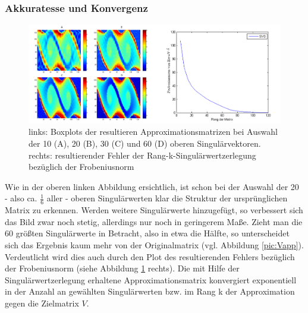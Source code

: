 \documentclass[12pt,a4paper,twoside]{article}
\begin{document}
\subsubsection*{Akkuratesse und Konvergenz}
\begin{figure}[h]
	
	\centering
	\includegraphics[scale=0.45]{SVD_plots_graph}
	\caption{\label{pic:SVD_plots}links: Boxplots der resultieren Approximationsmatrizen bei Auswahl der 10 (A), 20 (B), 30 (C) und 60 (D) oberen Singulärvektoren. rechts: resultierender Fehler der Rang-k-Singulärwertzerlegung bezüglich der Frobeniusnorm}
\end{figure}
Wie in der oberen linken Abbildung ersichtlich, ist schon bei der Auswahl der 20 - also ca. $\frac{1}{6}$ aller - oberen Singulärwerten klar die Struktur der ursprünglichen Matrix zu erkennen. Werden weitere Singulärwerte hinzugefügt, so verbessert sich das Bild zwar noch stetig, allerdings nur noch in geringerem Maße. Zieht man die 60 größten Singulärwerte in Betracht, also in etwa die Hälfte, so unterscheidet sich das Ergebnis kaum mehr von der Originalmatrix (vgl. Abbildung \ref{pic:Vapp}). \newline
\newline
Verdeutlicht wird dies auch durch den Plot des resultierenden Fehlers bezüglich der Frobeniusnorm (siehe Abbildung \ref{pic:SVD_plots} rechts). Die mit Hilfe der Singulärwertzerlegung erhaltene Approximationsmatrix konvergiert exponentiell in der Anzahl an gewählten Singulärwerten bzw. im Rang k der Approximation gegen die Zielmatrix $V$.
\end{document}
